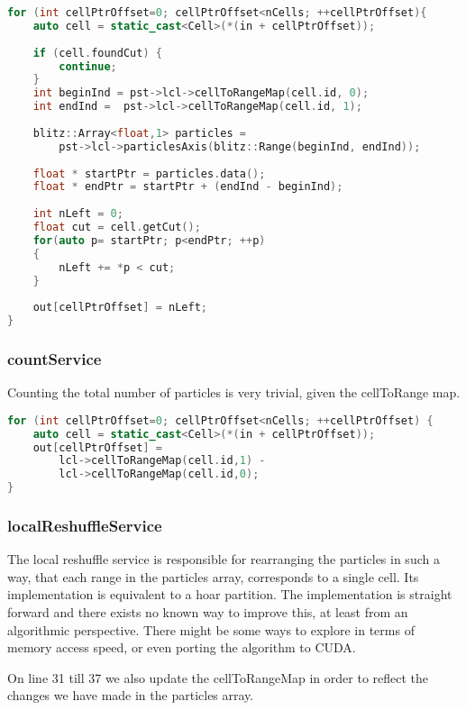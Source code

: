 \documentclass[]{article}
\begin{document}
\begin{lstlisting}[language=c++]
 for (int cellPtrOffset=0; cellPtrOffset<nCells; ++cellPtrOffset){
	auto cell = static_cast<Cell>(*(in + cellPtrOffset));
	
	if (cell.foundCut) {
		continue;
	}
	int beginInd = pst->lcl->cellToRangeMap(cell.id, 0);
	int endInd =  pst->lcl->cellToRangeMap(cell.id, 1);
	
	blitz::Array<float,1> particles =
		pst->lcl->particlesAxis(blitz::Range(beginInd, endInd));
	
	float * startPtr = particles.data();
	float * endPtr = startPtr + (endInd - beginInd);
	
	int nLeft = 0;
	float cut = cell.getCut();
	for(auto p= startPtr; p<endPtr; ++p)
	{
		nLeft += *p < cut;
	}
	
	out[cellPtrOffset] = nLeft;
}
\end{lstlisting}


\subsubsection{countService}

Counting the total number of particles is very trivial, given the cellToRange map. 

\begin{lstlisting}[language=c++]
for (int cellPtrOffset=0; cellPtrOffset<nCells; ++cellPtrOffset) {
	auto cell = static_cast<Cell>(*(in + cellPtrOffset));
	out[cellPtrOffset] = 
		lcl->cellToRangeMap(cell.id,1) - 
		lcl->cellToRangeMap(cell.id,0);
}

\end{lstlisting}

\subsubsection{localReshuffleService}
The local reshuffle service is responsible for rearranging the particles in such a way, that each range in the particles array, corresponds to a single cell. 
Its implementation is equivalent to a hoar partition. The implementation is straight forward and there exists no known way to improve this, at least from an algorithmic perspective. There might be some ways to explore in terms of memory access speed, or even porting the algorithm to CUDA. 
 
On line 31 till 37 we also update the cellToRangeMap in order to reflect the changes we have made in the particles array.
\end{document}
